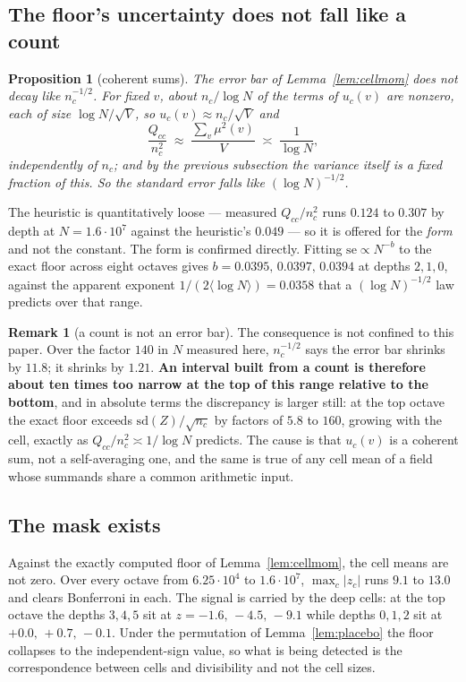 \documentclass[11pt,a4paper]{article}
\theoremstyle{plain}
\newtheorem{proposition}[theorem]{Proposition}
\theoremstyle{definition}
\newtheorem{remark}[theorem]{Remark}
\begin{document}
\subsection{The floor's uncertainty does not fall like a count}

\begin{proposition}[coherent sums]\label{prop:coh}
The error bar of Lemma~\ref{lem:cellmom} does \emph{not} decay like
$n_c^{-1/2}$. For fixed $v$, about $n_c/\log N$ of the terms of
$u_c(v)$ are nonzero, each of size $\log N/\sqrt V$, so
$u_c(v)\approx n_c/\sqrt V$ and
\[
  \frac{Q_{cc}}{n_c^2}
  \;\approx\; \frac{\sum_v\mu^2(v)}{V}
  \;\asymp\; \frac{1}{\log N},
\]
independently of $n_c$; and by the previous subsection the variance
itself is a fixed fraction of this. So the standard error falls like
$(\log N)^{-1/2}$.
\end{proposition}

The heuristic is quantitatively loose --- measured
$Q_{cc}/n_c^2$ runs $0.124$ to $0.307$ by depth at
$N=1.6\cdot10^7$ against the heuristic's $0.049$ --- so it is offered
for the \emph{form} and not the constant. The form is confirmed
directly. Fitting $\mathrm{se}\propto N^{-b}$ to the exact floor across
eight octaves gives $b = 0.0395,\,0.0397,\,0.0394$ at depths $2,1,0$,
against the apparent exponent $1/(2\langle\log N\rangle) = 0.0358$ that
a $(\log N)^{-1/2}$ law predicts over that range.

\begin{remark}[a count is not an error bar]
The consequence is not confined to this paper. Over the factor $140$ in
$N$ measured here, $n_c^{-1/2}$ says the error bar shrinks by $11.8$;
it shrinks by $1.21$. \textbf{An interval built from a count is
therefore about ten times too narrow at the top of this range relative
to the bottom}, and in absolute terms the discrepancy is larger still:
at the top octave the exact floor exceeds
$\mathrm{sd}(Z)/\sqrt{n_c}$ by factors of $5.8$ to $160$, growing with
the cell, exactly as $Q_{cc}/n_c^2 \asymp 1/\log N$ predicts. The cause
is that $u_c(v)$ is a coherent sum, not a self-averaging one, and the
same is true of any cell mean of a field whose summands share a common
arithmetic input.
\end{remark}

\subsection{The mask exists}

Against the exactly computed floor of Lemma~\ref{lem:cellmom}, the cell
means are not zero. Over every octave from $6.25\cdot10^4$ to
$1.6\cdot10^7$, $\max_c|z_c|$ runs $9.1$ to $13.0$ and clears
Bonferroni in each. The signal is carried by the deep cells: at the top
octave the depths $3,4,5$ sit at $z = -1.6,\,-4.5,\,-9.1$ while depths
$0,1,2$ sit at $+0.0,\,+0.7,\,-0.1$. Under the permutation of
Lemma~\ref{lem:placebo} the floor collapses to the independent-sign
value, so what is being detected is the correspondence between cells
and divisibility and not the cell sizes.
\end{document}
